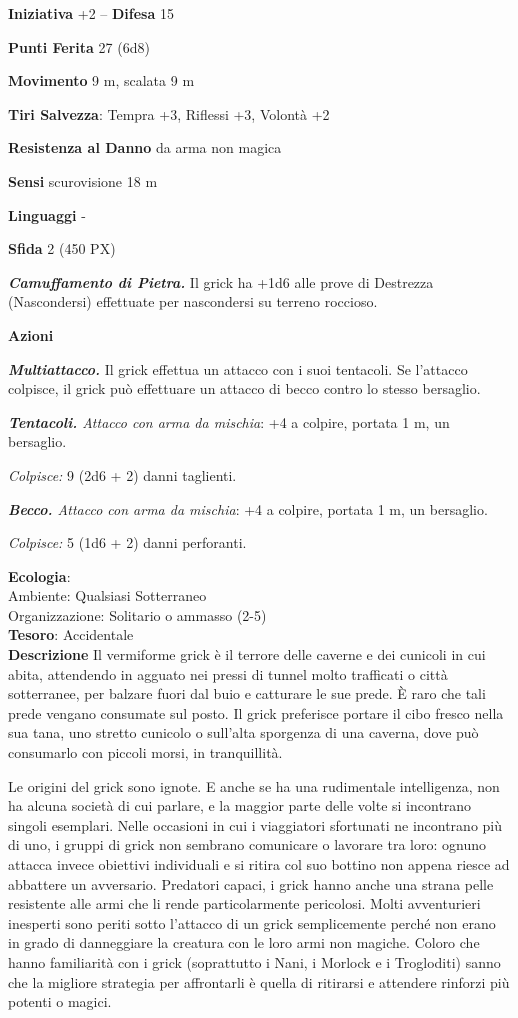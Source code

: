 \begin{multicols}{2}
\textbf{Iniziativa} +2 -- \textbf{Difesa} 15

\textbf{Punti Ferita} 27 (6d8)

\textbf{Movimento} 9 m, scalata 9 m

\textbf{Tiri Salvezza}: Tempra +3, Riflessi +3, Volontà +2

\textbf{Resistenza al Danno} da arma non magica

\textbf{Sensi} scurovisione 18 m

\textbf{Linguaggi} -

\textbf{Sfida} 2 (450 PX)

\textit{\textbf{Camuffamento di Pietra.}} Il grick ha +1d6 alle prove di Destrezza (Nascondersi) effettuate per nascondersi su terreno roccioso.

\textbf{Azioni}

\textit{\textbf{Multiattacco.}} Il grick effettua un attacco con i suoi tentacoli. Se l'attacco colpisce, il grick può effettuare un attacco di becco contro lo stesso bersaglio.

\textit{\textbf{Tentacoli.} Attacco con arma da mischia}: +4 a colpire, portata 1 m, un bersaglio.

\textit{Colpisce:} 9 (2d6 + 2) danni taglienti.

\textit{\textbf{Becco.} Attacco con arma da mischia}: +4 a colpire, portata 1 m, un bersaglio.

\textit{Colpisce:} 5 (1d6 + 2) danni perforanti.

\textbf{Ecologia}: \\
Ambiente: Qualsiasi Sotterraneo\\
Organizzazione: Solitario o ammasso (2-5)\\
\textbf{Tesoro}: Accidentale\\

\textbf{Descrizione}
Il vermiforme grick è il terrore delle caverne e dei cunicoli in cui abita, attendendo in agguato nei pressi di tunnel molto trafficati o città sotterranee, per balzare fuori dal buio e catturare le sue prede. È raro che tali prede vengano consumate sul posto. Il grick preferisce portare il cibo fresco nella sua tana, uno stretto cunicolo o sull'alta sporgenza di una caverna, dove può consumarlo con piccoli morsi, in tranquillità.

Le origini del grick sono ignote. E anche se ha una rudimentale intelligenza, non ha alcuna società di cui parlare, e la maggior parte delle volte si incontrano singoli esemplari. Nelle occasioni in cui i viaggiatori sfortunati ne incontrano più di uno, i gruppi di grick non sembrano comunicare o lavorare tra loro: ognuno attacca invece obiettivi individuali e si ritira col suo bottino non appena riesce ad abbattere un avversario. Predatori capaci, i grick hanno anche una strana pelle resistente alle armi che li rende particolarmente pericolosi. Molti avventurieri inesperti sono periti sotto l'attacco di un grick semplicemente perché non erano in grado di danneggiare la creatura con le loro armi non magiche. Coloro che hanno familiarità con i grick (soprattutto i Nani, i Morlock e i Trogloditi) sanno che la migliore strategia per affrontarli è quella di ritirarsi e attendere rinforzi più potenti o magici.


\end{multicols}
